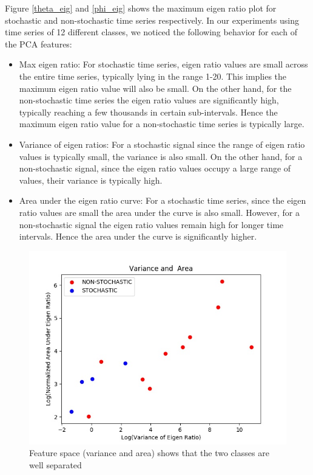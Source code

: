 \documentclass[10pt,conference]{IEEEtran}
\begin{document}
Figure \ref{theta_eig}  and \ref{phi_eig} shows the maximum eigen ratio plot for stochastic and non-stochastic time series respectively. In our experiments using time series of 12 different classes, we noticed the following behavior for each of the PCA features:
\begin{itemize}
  \item Max eigen ratio: For stochastic time series, eigen ratio values are small across the entire time series, typically lying in the range 1-20. This implies the maximum eigen ratio value will also be small. On the other hand, for the non-stochastic time series the eigen ratio values are significantly high, typically reaching a few thousands in certain sub-intervals. Hence the maximum eigen ratio value for a non-stochastic time series is typically large.
  \item Variance of eigen ratios: For a stochastic signal since the range of eigen ratio values is typically small, the variance is also small. On the other hand, for a non-stochastic signal, since the eigen ratio values occupy a large range of values, their variance is typically high.
  \item Area under the eigen ratio curve: For a stochastic time series, since the eigen ratio values are small the area under the curve is also small. However, for a non-stochastic signal the eigen ratio values remain high for longer time intervals. Hence the area under the curve is significantly higher.
\end{itemize}

\begin{figure}
    \centering
    \includegraphics[width=.9\linewidth]{variance_area.jpg}
    \caption{Feature space (variance and area) shows that the two classes are well separated}
    \label{figure11}
\end{figure}
\end{document}
